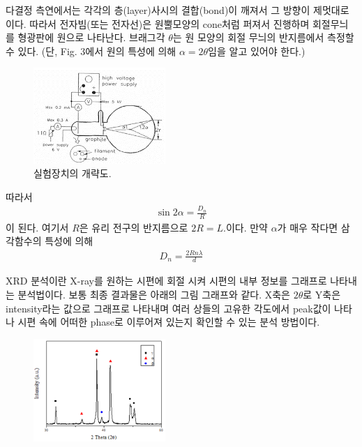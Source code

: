 \documentclass[a4paper, 10pt, nanum]{CSUniSchoolLabReport}
\begin{document}
	다결정 측연에서는 각각의 층(layer)사시의 결합(bond)이 깨져서 그 방향이 제멋대로이다. 따라서 전자빔(또는 전자선)은 원뿔모양의 cone처럼 퍼져서 진행하며 회절무늬를 형광판에 원으로 나타난다. 브래그각 $\theta$는 원 모양의 회절 무늬의 반지름에서 측정할 수 있다. (단, Fig. 3에서 원의 특성에 의해 $\alpha = 2\theta$임을 알고 있어야 한다.)
	\begin{figure}[ht!]
		\centering
		\includegraphics[width=5cm]{Figures/experiment.png}
		\caption{실험장치의 개략도.}
		\label{fig:experiment}
	\end{figure}
	따라서
	\begin{align}
		\sin 2\alpha = \frac{D_n}{R}
	\end{align}
	이 된다. 여기서 $R$은 유리 전구의 반지름으로 $2R = L$.이다. 만약 $\alpha$가 매우 작다면 삼각함수의 특성에 의해
	\begin{align}
		D_n = \frac{2Rn\lambda}{d}
	\end{align}

	XRD 분석이란 X-ray를 원하는 시편에 회절 시켜 시편의 내부 정보를 그래프로 나타내는 분석법이다. 보통 최종 결과물은 아래의 그림 그래프와 같다. X축은 $2\theta$로 Y축은 intensity라는 값으로 그래프로 나타내며 여러 상들의 고유한 각도에서 peak값이 나타나 시편 속에 어떠한 phase로 이루어져 있는지 확인할 수 있는 분석 방법이다.
	\begin{figure}[ht!]
		\centering
		\includegraphics[width=5cm]{Figures/exam_xrd.png}
		\caption{}
		\label{fig:exam_xrd}
	\end{figure}

\end{document}
